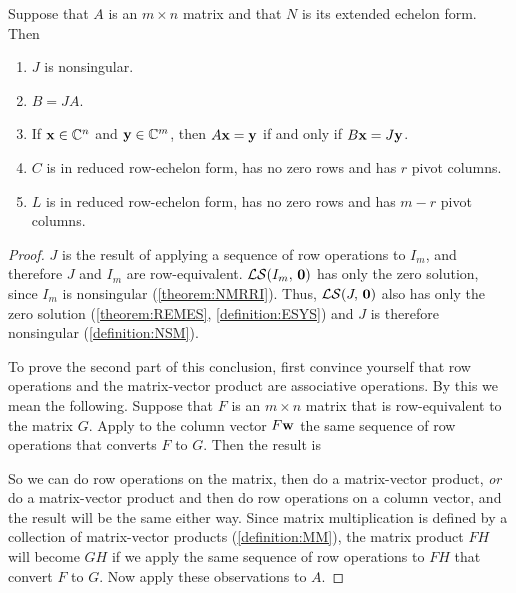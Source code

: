 \documentclass{ximera}
\begin{document}
\begin{theorem}
  \label{theorem:PEEF}

  Suppose that $A$ is an $m\times n$ matrix and that $N$ is its extended echelon form.  Then
  \begin{enumerate}
  \item $J$ is nonsingular.
  \item $B=JA$.
  \item If $\mathbf{x}\in\mathbb{C}^{n}$ and $\mathbf{y}\in\mathbb{C}^{m}$, then $A\mathbf{x}=\mathbf{y}$ if and only if $B\mathbf{x}=J\mathbf{y}$.
  \item $C$ is in reduced row-echelon form, has no zero rows and has $r$ pivot columns.
  \item $L$ is in reduced row-echelon form, has no zero rows and has $m-r$ pivot columns.
  \end{enumerate}

  \begin{proof}
    $J$ is the result of applying a sequence of row operations to
    $I_m$, and therefore $J$ and $I_m$ are row-equivalent.
    $\mathcal{LS}\!\left(I_m,\,\mathbf{0}\right)$ has only the zero solution, since $I_m$ is
    nonsingular (\ref{theorem:NMRRI}).  Thus, $\mathcal{LS}\!\left(J,\,\mathbf{0}\right)$ also
    has only the zero solution (\ref{theorem:REMES},
    \ref{definition:ESYS}) and $J$ is therefore nonsingular
    (\ref{definition:NSM}).

    To prove the second part of this conclusion, first convince
    yourself that row operations and the matrix-vector product are
    associative operations.  By this we mean the following.  Suppose
    that $F$ is an $m\times n$ matrix that is row-equivalent to the
    matrix $G$.  Apply to the column vector $F\mathbf{w}$ the same
    sequence of row operations that converts $F$ to $G$.  Then the
    result is 
    \begin{multipleChoice}
    \end{multipleChoice}

    So we can do row operations on the matrix, then do a matrix-vector
    product, \textit{or} do a matrix-vector product and then do row
    operations on a column vector, and the result will be the same
    either way.  Since matrix multiplication is defined by a
    collection of matrix-vector products (\ref{definition:MM}), the
    matrix product $FH$ will become $GH$ if we apply the same sequence
    of row operations to $FH$ that convert $F$ to $G$.  Now apply
    these observations to $A$.


\end{proof}
\end{theorem}
\end{document}
